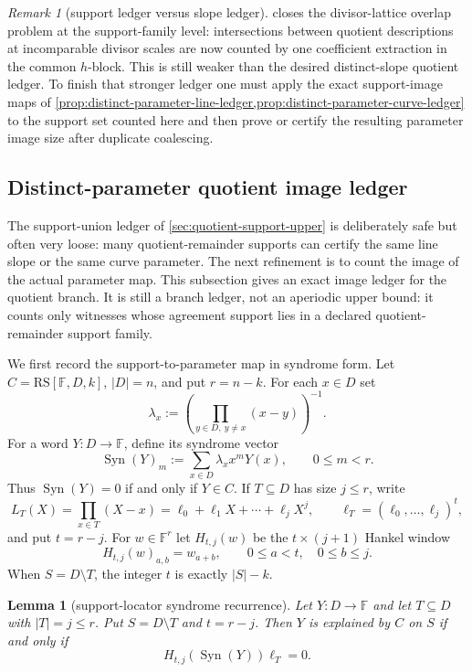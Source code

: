 \documentclass[11pt]{article}
\newtheorem{lemma}[theorem]{Lemma}
\theoremstyle{definition}
\theoremstyle{remark}
\newtheorem{remark}[theorem]{Remark}
\newcommand{\F}{\mathbb{F}}
\newcommand{\RS}{\mathrm{RS}}
\newcommand{\Syn}{\operatorname{Syn}}
\begin{document}
\begin{remark}[support ledger versus slope ledger]
\label{rem:support-vs-slope-ledger}
 closes the divisor-lattice overlap
problem at the support-family level: intersections between quotient descriptions
at incomparable divisor scales are now counted by one coefficient extraction in
the common $h$-block.  This is still weaker than the desired distinct-slope
quotient ledger.  To finish that stronger ledger one must apply the exact
support-image maps of
\cref{prop:distinct-parameter-line-ledger,prop:distinct-parameter-curve-ledger}
to the support set counted here and then prove or certify the resulting parameter
image size after duplicate coalescing.
\end{remark}

\subsection{Distinct-parameter quotient image ledger}
\label{sec:quotient-distinct-parameter}

The support-union ledger of \cref{sec:quotient-support-upper} is deliberately
safe but often very loose: many quotient-remainder supports can certify the same
line slope or the same curve parameter.  The next refinement is to count the
image of the actual parameter map.  This subsection gives an exact image ledger
for the quotient branch.  It is still a branch ledger, not an aperiodic upper
bound: it counts only witnesses whose agreement support lies in a declared
quotient-remainder support family.

We first record the support-to-parameter map in syndrome form.  Let
$C=\RS[\F,D,k]$, $|D|=n$, and put $r=n-k$.  For each $x\in D$ set
\[
        \lambda_x:=\left(\prod_{y\in D,\ y\ne x}(x-y)\right)^{-1}.
\]
For a word $Y:D\to\F$, define its syndrome vector
\[
        \Syn(Y)_m:=\sum_{x\in D}\lambda_x x^mY(x),
        \qquad 0\le m<r .
\]
Thus $\Syn(Y)=0$ if and only if $Y\in C$.  If
$T\subseteq D$ has size $j\le r$, write
\[
        L_T(X)=\prod_{x\in T}(X-x)=\ell_0+\ell_1X+\cdots+\ell_jX^j,
        \qquad
        \boldsymbol\ell_T=(\ell_0,\ldots,\ell_j)^t,
\]
and put $t=r-j$.  For $w\in\F^r$ let $H_{t,j}(w)$ be the $t\times(j+1)$ Hankel
window
\[
        H_{t,j}(w)_{a,b}=w_{a+b},
        \qquad 0\le a<t,\quad 0\le b\le j .
\]
When $S=D\setminus T$, the integer $t$ is exactly $|S|-k$.


\begin{lemma}[support-locator syndrome recurrence]
\label{lem:support-locator-syndrome-recurrence}
Let $Y:D\to\F$ and let $T\subseteq D$ with $|T|=j\le r$.  Put
$S=D\setminus T$ and $t=r-j$.  Then $Y$ is explained by $C$ on $S$ if and only if
\[
        H_{t,j}(\Syn(Y))\boldsymbol\ell_T=0 .
\]
\end{lemma}
\end{document}
